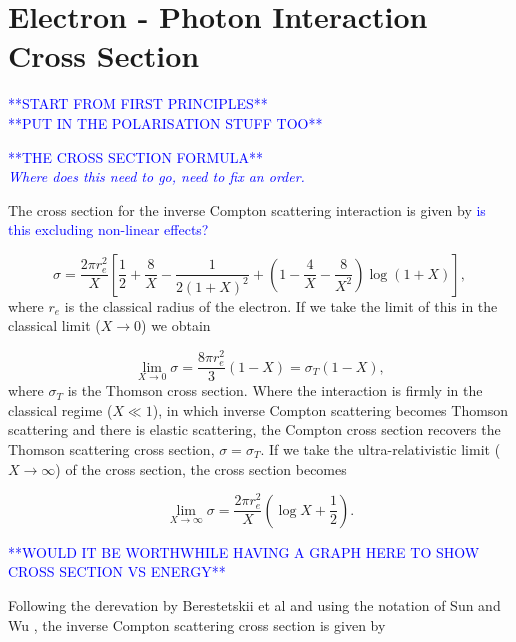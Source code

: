 \documentclass[../main.tex]{subfiles}
\begin{document}
\section{Electron - Photon Interaction Cross Section}

\textcolor{blue}{**START FROM FIRST PRINCIPLES** \\ **PUT IN THE POLARISATION STUFF TOO**}

\textcolor{blue}{**THE CROSS SECTION FORMULA** \\ \textit{Where does this need to go, need to fix an order.}}

The cross section for the inverse Compton scattering interaction \cite{berestetskii1982quantum} is given by \textcolor{blue}{is this excluding non-linear effects?}

\begin{equation}
 \sigma = \frac{2\pi r_{e}^{2}}{X}\left[\frac{1}{2}+\frac{8}{X}-\frac{1}{2\left(1+X\right)^{2}}+\left(1-\frac{4}{X}-\frac{8}{X^{2}}\right)\log{\left(1+X\right)}\right],
 \label{eq:compton_cross_section}
\end{equation}
where $r_{e}$ is the classical radius of the electron. If we take the limit of this in the classical limit ($X \to 0$) we obtain

\begin{equation}
\lim_{X \to 0} \sigma = \frac{8\pi r_{e}^{2}}{3}\left(1-X\right) = \sigma_{T}\left(1-X\right),
\label{eq:compton_cross_section_classical_limit}
\end{equation}
where $\sigma_{T}$ is the Thomson cross section. Where the interaction is firmly in the classical regime ($X \ll 1$), in which inverse Compton scattering becomes Thomson scattering and there is elastic scattering, the Compton cross section recovers the Thomson scattering cross section, $\sigma = \sigma_{T}$. If we take the ultra-relativistic limit ($X \to \infty$) of the cross section, the cross section becomes

\begin{equation}
\lim_{X \to \infty} \sigma = \frac{2\pi r_{e}^{2}}{X}\left(\log{X}+\frac{1}{2}\right).
\label{eq:compton_cross_section_ultrarelativistic_limit}
\end{equation}

\textcolor{blue}{**WOULD IT BE WORTHWHILE HAVING A GRAPH HERE TO SHOW CROSS SECTION VS ENERGY**}

Following the derevation by Berestetskii et al \cite{berestetskii1982quantum} and using the notation of Sun and Wu \cite{sun2011theoretical}, the inverse Compton scattering cross section is given by
\end{document}
